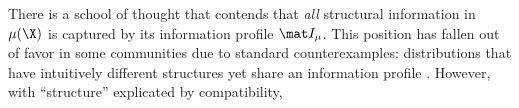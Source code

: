 There is a school of thought
that contends that \emph{all} structural information in $\mu(\X)$ is captured by its information profile $\mat I_\mu$.
This position has fallen out of favor
in some communities
due to standard counterexamples: distributions that have intuitively different structures yet share an information profile
\citep{multivar-beyondshannon17}. 
However, with ``structure''  explicated by compatibility,

